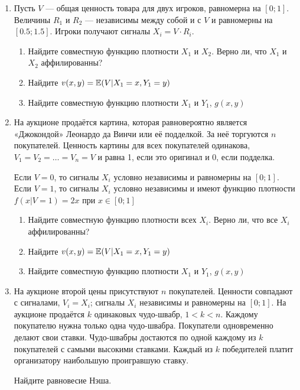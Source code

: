 \begin{enumerate}


\item Пусть $  V $ — общая ценность товара для двух игроков, равномерна на $ [0;1] $. Величины $ R_{1} $ и $ R_{2} $ — независимы между собой и с $ V $ и равномерны на $ [0.5;1.5] $. Игроки получают сигналы $ X_{i}=V\cdot R_{i} $.
\begin{enumerate}
\item Найдите совместную функцию плотности $ X_{1} $ и $ X_{2} $. Верно ли, что $ X_{1} $ и $ X_{2} $ аффилированны?
\item Найдите $ v(x,y)=\mathbb{E}(V|X_{1}=x,Y_{1}=y) $
\item Найдите совместную функцию плотности $ X_{1} $ и $ Y_{1} $, $ g(x,y) $
\end{enumerate}


\item На аукционе продаётся картина, которая равновероятно является «Джокондой» Леонардо да Винчи или её подделкой. За неё торгуются $ n $ покупателей. Ценность картины для всех покупателей одинакова, $ V_{1}=V_{2}=\ldots=V_{n}=V $ и равна 1, если это оригинал и 0, если подделка.

Если $ V=0 $, то сигналы $ X_{i} $ условно независимы и равномерны на $ [0;1] $. Если $ V=1 $, то сигналы $ X_{i} $ условно независимы и имеют функцию плотности $ f(x|V=1)=2x $ при  $x\in [0;1] $
\begin{enumerate}
\item Найдите совместную функцию плотности всех $ X_{i} $. Верно ли, что все $ X_{i} $ аффилированны?
\item Найдите $ v(x,y)=\mathbb{E}(V|X_{1}=x,Y_{1}=y) $
\item Найдите совместную функцию плотности $ X_{1} $ и $ Y_{1} $, $ g(x,y) $
\end{enumerate}



\item На аукционе второй цены присутствуют $ n $ покупателей. Ценности совпадают с сигналами, $ V_{i}=X_{i} $; сигналы $ X_{i} $ независимы и равномерны на $ [0;1] $. На аукционе продаётся $k$ одинаковых чудо-швабр, $ 1<k<n $. Каждому покупателю нужна только одна чудо-швабра. Покупатели одновременно делают свои ставки. Чудо-швабры достаются по одной каждому из $ k $ покупателей с самыми высокими ставками. Каждый из $ k $ победителей платит организатору наибольшую проигравшую ставку.

Найдите равновесие Нэша.


\end{enumerate}
